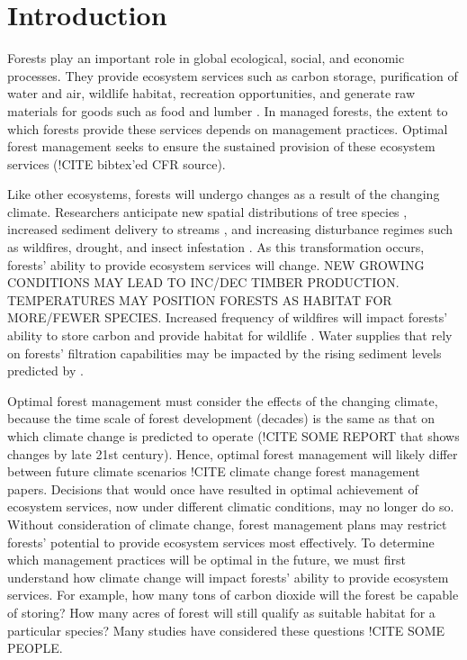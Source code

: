 
\section{Introduction}
 
Forests play an important role in global ecological, social, and economic processes. They provide ecosystem services such as carbon storage, purification of water and air, wildlife habitat, recreation opportunities, and generate raw materials for goods such as food and lumber \cite{daily1997ecosystem}. In managed forests, the extent to which forests provide these services depends on management practices. Optimal forest management seeks to ensure the sustained provision of these ecosystem services (!CITE bibtex'ed CFR source).

Like other ecosystems, forests will undergo changes as a result of the changing climate. Researchers anticipate new spatial distributions of tree species \cite{iverson1998predicting}, increased sediment delivery to streams \cite{Goode20121}, and increasing disturbance regimes such as wildfires, drought, and insect infestation \cite{vose2012effects}. As this transformation occurs, forests’ ability to provide ecosystem services will change. NEW GROWING CONDITIONS MAY LEAD TO INC/DEC TIMBER PRODUCTION. TEMPERATURES MAY POSITION FORESTS AS HABITAT FOR MORE/FEWER SPECIES. Increased frequency of wildfires will impact forests’ ability to store carbon \cite{bonan2008forests} and provide habitat for wildlife \cite{mckenzie2004climatic}. Water supplies that rely on forests’ filtration capabilities may be impacted by the rising sediment levels predicted by \cite{Goode20121}.

Optimal forest management must consider the effects of the changing climate, because the time scale of forest development (decades) is the same as that on which climate change is predicted to operate (!CITE SOME REPORT that shows changes by late 21st century). Hence, optimal forest management will likely differ between future climate scenarios !CITE climate change forest management papers. Decisions that would once have resulted in optimal achievement of ecosystem services, now under different climatic conditions, may no longer do so. Without consideration of climate change, forest management plans may restrict forests' potential to provide ecosystem services most effectively. To determine which management practices will be optimal in the future, we must first understand how climate change will impact forests' ability to provide ecosystem services. For example, how many tons of carbon dioxide will the forest be capable of storing? How many acres of forest will still qualify as suitable habitat for a particular species? Many studies have considered these questions !CITE SOME PEOPLE.

